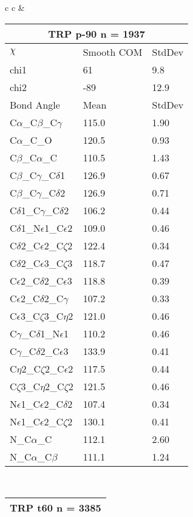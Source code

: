 \begin{longtable}{ c c }
  &
  \begin{tabular}{ l l l }
  \toprule
  \multicolumn{3}{c}{TRP \textbf{p-90} n = 1937} \\ \toprule
  $\chi$       & Smooth COM & StdDev \\ \midrule
  chi1 & 61 & 9.8 \\ 
  chi2 & -89 & 12.9 \\ \midrule
  Bond Angle   & Mean     & StdDev \\ \midrule
  C$\alpha$\_C$\beta$\_C$\gamma$ & 115.0 & 1.90\\
  C$\alpha$\_C\_O & 120.5 & 0.93\\
  C$\beta$\_C$\alpha$\_C & 110.5 & 1.43\\
  C$\beta$\_C$\gamma$\_C$\delta$1 & 126.9 & 0.67\\
  C$\beta$\_C$\gamma$\_C$\delta$2 & 126.9 & 0.71\\
  C$\delta$1\_C$\gamma$\_C$\delta$2 & 106.2 & 0.44\\
  C$\delta$1\_N$\epsilon$1\_C$\epsilon$2 & 109.0 & 0.46\\
  C$\delta$2\_C$\epsilon$2\_C$\zeta$2 & 122.4 & 0.34\\
  C$\delta$2\_C$\epsilon$3\_C$\zeta$3 & 118.7 & 0.47\\
  C$\epsilon$2\_C$\delta$2\_C$\epsilon$3 & 118.8 & 0.39\\
  C$\epsilon$2\_C$\delta$2\_C$\gamma$ & 107.2 & 0.33\\
  C$\epsilon$3\_C$\zeta$3\_C$\eta$2 & 121.0 & 0.46\\
  C$\gamma$\_C$\delta$1\_N$\epsilon$1 & 110.2 & 0.46\\
  C$\gamma$\_C$\delta$2\_C$\epsilon$3 & 133.9 & 0.41\\
  C$\eta$2\_C$\zeta$2\_C$\epsilon$2 & 117.5 & 0.44\\
  C$\zeta$3\_C$\eta$2\_C$\zeta$2 & 121.5 & 0.46\\
  N$\epsilon$1\_C$\epsilon$2\_C$\delta$2 & 107.4 & 0.34\\
  N$\epsilon$1\_C$\epsilon$2\_C$\zeta$2 & 130.1 & 0.41\\
  N\_C$\alpha$\_C & 112.1 & 2.60\\
  N\_C$\alpha$\_C$\beta$ & 111.1 & 1.24\\
  \bottomrule
  \end{tabular}
  \\
  \begin{tabular}{ l l l }
  \toprule
  \multicolumn{3}{c}{TRP \textbf{t60} n = 3385} \\ \toprule

\end{tabular}
\end{longtable}
